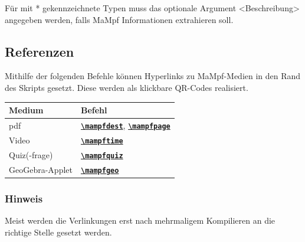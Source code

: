 \documentclass[parskip=off,index=totocnumbered]{scrartcl}
\begin{document}
\noindent Für mit * gekennzeichnete Typen muss das optionale Argument <Beschreibung> angegeben werden, falls MaMpf Informationen extrahieren soll. 
   

\subsection{Referenzen}
Mithilfe der folgenden Befehle können Hyperlinks zu MaMpf-Medien in den Rand des Skripts gesetzt. Diese werden als klickbare QR-Codes realisiert.

\vspace{0.6cm}
\begin{minipage}{\textwidth}
   \begin{center}
   \begin{tabular} { l l } \toprule
      Medium & Befehl \\ \midrule 
      pdf & \hyperref[subsubsec:dest]{\texttt{\textbf{\textbackslash mampfdest}}}, \hyperref[subsubsec:page]{\texttt{\textbf{\textbackslash mampfpage}}} \\
      Video & \hyperref[subsubsec:time]{\texttt{\textbf{\textbackslash mampftime}}} \\
      Quiz(-frage) & \hyperref[subsubsec:quiz]{\texttt{\textbf{\textbackslash mampfquiz}}} \\
      GeoGebra-Applet & \hyperref[subsubsec:geo]{\texttt{\textbf{\textbackslash mampfgeo}}} \\ \bottomrule
   \end{tabular}
   \end{center}
\end{minipage}

\subsubsection*{Hinweis}Meist werden die Verlinkungen erst nach mehrmaligem Kompilieren an die richtige Stelle gesetzt werden. 
\vspace{0.4cm}

\end{document}
